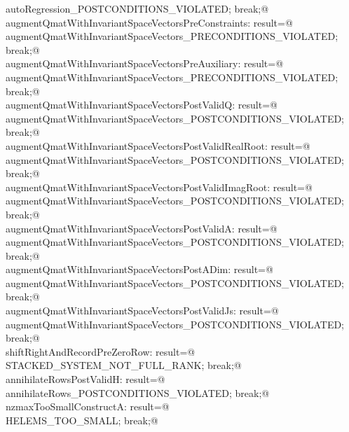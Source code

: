 \documentclass[12pt]{article}
\begin{document}
\begin{flushleft}
\begin{minipage}{\linewidth}
\begin{list}{}{}
\mbox{}\verb@  autoRegression_POSTCONDITIONS_VIOLATED; break;@\\
\mbox{}\verb@case  augmentQmatWithInvariantSpaceVectorsPreConstraints: result=@\\
\mbox{}\verb@  augmentQmatWithInvariantSpaceVectors_PRECONDITIONS_VIOLATED; break;@\\
\mbox{}\verb@case  augmentQmatWithInvariantSpaceVectorsPreAuxiliary: result=@\\
\mbox{}\verb@  augmentQmatWithInvariantSpaceVectors_PRECONDITIONS_VIOLATED; break;@\\
\mbox{}\verb@case  augmentQmatWithInvariantSpaceVectorsPostValidQ: result=@\\
\mbox{}\verb@  augmentQmatWithInvariantSpaceVectors_POSTCONDITIONS_VIOLATED; break;@\\
\mbox{}\verb@case  augmentQmatWithInvariantSpaceVectorsPostValidRealRoot: result=@\\
\mbox{}\verb@  augmentQmatWithInvariantSpaceVectors_POSTCONDITIONS_VIOLATED; break;@\\
\mbox{}\verb@case  augmentQmatWithInvariantSpaceVectorsPostValidImagRoot: result=@\\
\mbox{}\verb@  augmentQmatWithInvariantSpaceVectors_POSTCONDITIONS_VIOLATED; break;@\\
\mbox{}\verb@case  augmentQmatWithInvariantSpaceVectorsPostValidA: result=@\\
\mbox{}\verb@  augmentQmatWithInvariantSpaceVectors_POSTCONDITIONS_VIOLATED; break;@\\
\mbox{}\verb@case  augmentQmatWithInvariantSpaceVectorsPostADim: result=@\\
\mbox{}\verb@  augmentQmatWithInvariantSpaceVectors_POSTCONDITIONS_VIOLATED; break;@\\
\mbox{}\verb@case  augmentQmatWithInvariantSpaceVectorsPostValidJs: result=@\\
\mbox{}\verb@  augmentQmatWithInvariantSpaceVectors_POSTCONDITIONS_VIOLATED; break;@\\
\mbox{}\verb@case  shiftRightAndRecordPreZeroRow: result=@\\
\mbox{}\verb@  STACKED_SYSTEM_NOT_FULL_RANK; break;@\\
\mbox{}\verb@case  annihilateRowsPostValidH: result=@\\
\mbox{}\verb@  annihilateRows_POSTCONDITIONS_VIOLATED; break;@\\
\mbox{}\verb@case nzmaxTooSmallConstructA: result=@\\
\mbox{}\verb@  HELEMS_TOO_SMALL; break;@\\

\end{list}
\end{minipage}
\end{flushleft}
\end{document}
